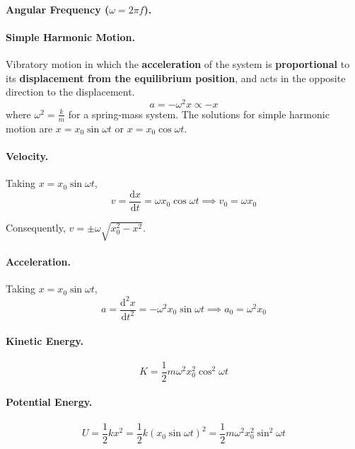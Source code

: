 \documentclass{article}
\begin{document}
\paragraph{Angular Frequency ($\omega = 2\pi f$).}

\paragraph{Simple Harmonic Motion.} Vibratory motion in which the
\textbf{acceleration} of the system is \textbf{proportional} to its
\textbf{displacement from the equilibrium position}, and acts in the opposite
direction to the displacement. \begin{equation} a = -\omega^2 x \propto -x
\end{equation} where $\omega^2 = \frac{k}{m}$ for a spring-mass system. The
solutions for simple harmonic motion are $x = x_0\sin\omega t$ or $x =
x_0\cos\omega t$.

\paragraph{Velocity.} Taking $x = x_0\sin\omega t$, \begin{equation} v =
\frac{\mathrm{d}x}{\mathrm{d}t} = \omega x_0\cos\omega t \implies v_0 = \omega
x_0 \end{equation}

Consequently, $v = \pm\omega\sqrt{x_0^2 - x^2}$.

\paragraph{Acceleration.} Taking $x = x_0\sin\omega t$, \begin{equation} a =
\frac{\mathrm{d}^2x}{\mathrm{d}t^2} = -\omega^2 x_0\sin\omega t \implies a_0 =
\omega^2 x_0 \end{equation}

\paragraph{Kinetic Energy.} \begin{equation} K = \frac{1}{2}m\omega^2 x_0^2
\cos^2 \omega t \end{equation}

\paragraph{Potential Energy.} \begin{equation} U = \frac{1}{2}kx^2 = \frac{1}{2}
k (x_0\sin\omega t)^2 = \frac{1}{2}m\omega^2 x_0^2 \sin^2\omega t \end{equation}
\end{document}
